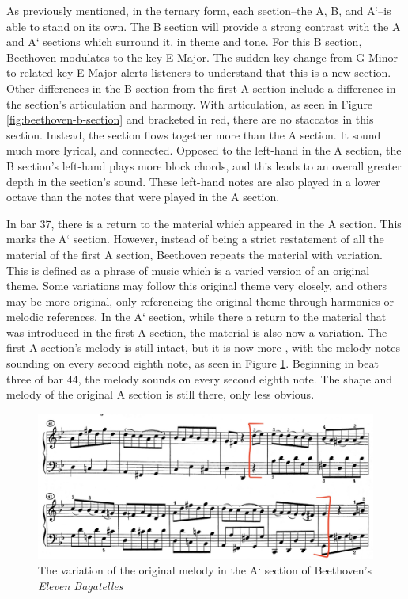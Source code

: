 As previously mentioned, in the ternary form, each section--the A, B, and A`--is able to stand on its own. The B section will provide a strong contrast with the A and A` sections which surround it, in theme and tone. For this B section, Beethoven modulates to the key E\musFlat{} Major. The sudden key change from G Minor to related key E\musFlat{} Major alerts listeners to understand that this is a new section. Other differences in the B section from the first A section include a difference in the section's articulation and harmony. With articulation, as seen in Figure \ref{fig:beethoven-b-section}\autocite{Henle_1978} and bracketed in red, there are no staccatos in this section. Instead, the section flows together more than the A section. It sound much more lyrical, and connected. Opposed to the left-hand in the A section, the B section's left-hand plays more block chords, and this leads to an overall greater depth in the section's sound. These left-hand notes are also played in a lower octave than the notes that were played in the A section. 

In bar 37, there is a return to the material which appeared in the A section. This marks the A` section. However, instead of being a strict restatement of all the material of the first A section, Beethoven repeats the material with variation. This is defined as a phrase of music which is a varied version of an original theme. Some variations may follow this original theme very closely, and others may be more original, only referencing the original theme through harmonies or melodic references.\autocite{Kennedy_Kennedy_Rutherford-Johnson_2013b} In the A` section, while there a return to the material that was introduced in the first A section, the material is also now a variation. The first A section's melody is still intact, but it is now more , with the melody notes sounding on every second eighth note, as seen in Figure \ref{fig:beethoven-a-prime-melody-variation}\autocite{Henle_1978}. Beginning in beat three of bar 44, the melody sounds on every second eighth note. The shape and melody of the original A section is still there, only less obvious.

\begin{figure}
	\centering
	\includegraphics[width=\textwidth]{figures/beethoven-a-prime-melody-variation}
	\caption{The variation of the original melody in the A` section of Beethoven's \textit{Eleven Bagatelles}}
	\label{fig:beethoven-a-prime-melody-variation}
\end{figure}

